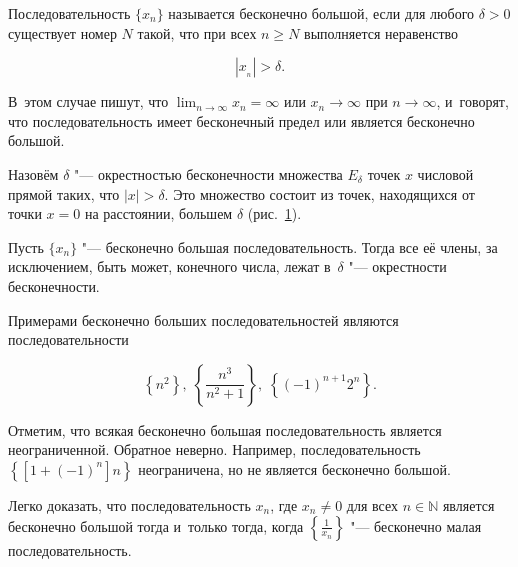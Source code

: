 
Последовательность $\{x_{n}\}$ называется бесконечно большой, если для любого
$\delta > 0$ существует номер $N$ такой, что при всех $n \geqslant N$
выполняется неравенство

\begin{equation*}
\left| x_{_n} \right| > \delta.
\end{equation*}

\noindent
В~этом случае пишут, что $\displaystyle \lim_{n \to \infty} x_{n} = \infty$
или $x_{n} \to \infty$ при $n \to \infty$, и~говорят, что последовательность
имеет бесконечный предел или является бесконечно большой.

Назовём $\delta$ "--- окрестностью бесконечности множества $E_{\delta}$ точек
$x$ числовой прямой таких, что $|x| > \delta$.
Это множество состоит из точек, находящихся от точки $x = 0$ на расстоянии,
большем $\delta$ (рис.\ \ref{fig:3_2_2_1}).

\begin{figure}\label{fig:3_2_2_1}
\end{figure}

Пусть $\{x_{n}\}$ "---  бесконечно большая последовательность.
Тогда все её члены, за исключением, быть может, конечного числа, лежат
в~$\delta$ "--- окрестности бесконечности.

Примерами бесконечно больших последовательностей являются последовательности

\begin{equation*}
\left\{ n^{2} \right\}, \;
\displaystyle \left\{ \frac{n^{3}}{n^{2} + 1} \right\}, \;
\left\{ (-1)^{n+1} 2^{n} \right\}.
\end{equation*}

Отметим, что всякая бесконечно большая последовательность является неограниченной.
Обратное неверно. Например, последовательность
$\left\{ \left[ 1+(-1)^{n} \right]n \right\}$ неограничена, но не является
бесконечно большой.

Легко доказать, что последовательность ${x_{n}}$, где $x_{n} \ne 0$
для всех $n \in \mathbb{N}$ является бесконечно большой тогда и~только тогда,
когда $\displaystyle \left\{ \frac{1}{x_{n}} \right\}$ "--- бесконечно малая
последовательность.
